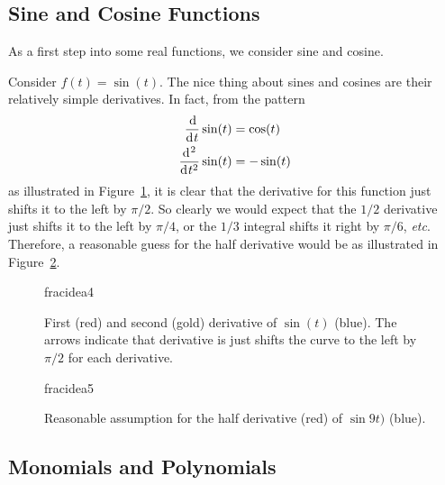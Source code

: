 \subsection{Sine and Cosine Functions}
As a first step into some real functions, we consider sine and cosine.

\begin{example}
  Consider $f(t) = \sin(t)$. The nice thing about sines and cosines are their relatively simple derivatives. In fact, from the pattern
  \begin{align*}
	\frac{\operatorname{d}\hspace*{-1pt}}{\operatorname{d}\hspace*{-1pt} t} \sin(t) &= \cos(t) \\
	\frac{\operatorname{d}\hspace*{-1pt}^2}{\operatorname{d}\hspace*{-1pt} t^2} \sin(t) &= -\sin(t)
  \end{align*}
  as illustrated in Figure~\ref{fig:fracidea4}, it is clear that the derivative
  for this function just shifts it to the left by $\pi/2$. So clearly we would
  expect that the $1/2$ derivative just shifts it to the left by $\pi/4$, or the
  $1/3$ integral shifts it right by $\pi/6$, \textit{etc}. Therefore, a reasonable
  guess for the half derivative would be as illustrated in
  Figure~\ref{fig:fracidea5}.

  \begin{figure}
	\centering
	{fracidea4}
		\caption{First (red) and second (gold) derivative of $\sin(t)$ (blue). The
	arrows indicate that derivative is just shifts the curve to the left by
  $\pi/2$ for each derivative.}
		\label{fig:fracidea4}
  \end{figure}

  \begin{figure}
	\centering
	{fracidea5}
  \caption{Reasonable assumption for the half derivative (red) of $\sin9t)$
	(blue).}
  \label{fig:fracidea5}
\end{figure}

\end{example}

\subsection{Monomials and Polynomials}

